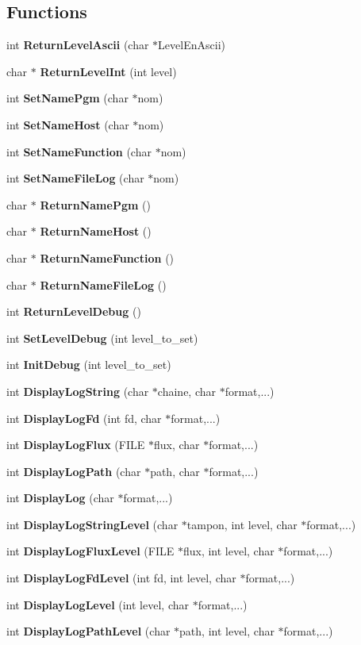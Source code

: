 \subsection*{Functions}
\begin{CompactItemize}
\item 
int {\bf Return\-Level\-Ascii} (char $\ast$Level\-En\-Ascii)
\item 
char $\ast$ {\bf Return\-Level\-Int} (int level)
\item 
int {\bf Set\-Name\-Pgm} (char $\ast$nom)
\item 
int {\bf Set\-Name\-Host} (char $\ast$nom)
\item 
int {\bf Set\-Name\-Function} (char $\ast$nom)
\item 
int {\bf Set\-Name\-File\-Log} (char $\ast$nom)
\item 
char $\ast$ {\bf Return\-Name\-Pgm} ()
\item 
char $\ast$ {\bf Return\-Name\-Host} ()
\item 
char $\ast$ {\bf Return\-Name\-Function} ()
\item 
char $\ast$ {\bf Return\-Name\-File\-Log} ()
\item 
int {\bf Return\-Level\-Debug} ()
\item 
int {\bf Set\-Level\-Debug} (int level\_\-to\_\-set)
\item 
int {\bf Init\-Debug} (int level\_\-to\_\-set)
\item 
int {\bf Display\-Log\-String} (char $\ast$chaine, char $\ast$format,...)
\item 
int {\bf Display\-Log\-Fd} (int fd, char $\ast$format,...)
\item 
int {\bf Display\-Log\-Flux} (FILE $\ast$flux, char $\ast$format,...)
\item 
int {\bf Display\-Log\-Path} (char $\ast$path, char $\ast$format,...)
\item 
int {\bf Display\-Log} (char $\ast$format,...)
\item 
int {\bf Display\-Log\-String\-Level} (char $\ast$tampon, int level, char $\ast$format,...)
\item 
int {\bf Display\-Log\-Flux\-Level} (FILE $\ast$flux, int level, char $\ast$format,...)
\item 
int {\bf Display\-Log\-Fd\-Level} (int fd, int level, char $\ast$format,...)
\item 
int {\bf Display\-Log\-Level} (int level, char $\ast$format,...)
\item 
int {\bf Display\-Log\-Path\-Level} (char $\ast$path, int level, char $\ast$format,...)

\end{CompactItemize}
